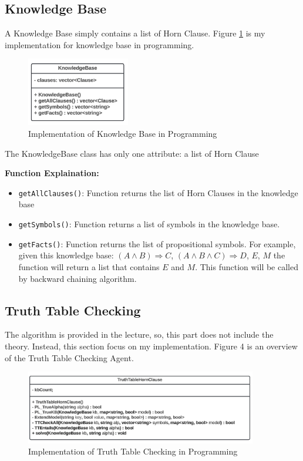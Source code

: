 \documentclass{assignment}
\begin{document}
\subsection{Knowledge Base}

A Knowledge Base simply contains a list of Horn Clause. Figure \ref{fig:fig3} is my implementation for knowledge base in programming.

\begin{figure}[h]
    \centering
    \includegraphics[width=0.4\textwidth]{./assets/KnowledgeBase.png}
    \caption{Implementation of Knowledge Base in Programming}
    \label{fig:fig3}
\end{figure}

The KnowledgeBase class has only one attribute: a list of Horn Clause

\textbf{Function Explaination:}
\begin{itemize}
  \item \texttt{getAllClauses()}: Function returns the list of Horn Clauses in the knowledge base
  \item \texttt{getSymbols()}: Function returns a list of symbols in the knowledge base.
  \item \texttt{getFacts()}: Function returns the list of propositional symbols. For example, given this knowledge base: $(A \land B) \Rightarrow C$, $(A \land B \land C) \Rightarrow D$, $E$, $M$ the function will return a list that contains $E$ and $M$. This function will be called by backward chaining algorithm.  
\end{itemize}

\subsection{Truth Table Checking}
The algorithm is provided in the lecture, so, this part does not include the theory. Instead, this section focus on my implementation. Figure 4 is an overview of the Truth Table Checking Agent.

\begin{figure}[h]
    \centering
    \includegraphics[width=0.9\textwidth]{./assets/TTHornClause.png}
    \caption{Implementation of Truth Table Checking in Programming}
    \label{fig:fig4}
\end{figure}
\end{document}
